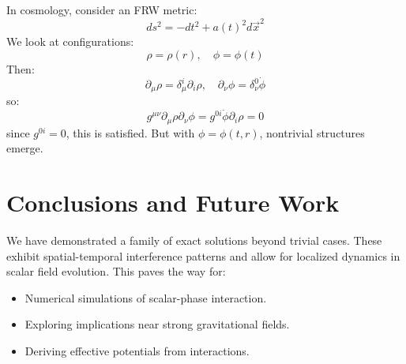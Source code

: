 \documentclass{article}
\begin{document}
In cosmology, consider an FRW metric:
\[
ds^2 = -dt^2 + a(t)^2 d\vec{x}^2
\]
We look at configurations:
\[
\rho = \rho(r), \quad \phi = \phi(t)
\]
Then:
\[
\partial_\mu \rho = \delta^i_\mu \partial_i \rho, \quad
\partial_\nu \phi = \delta^0_\nu \dot{\phi}
\]
so:
\[
g^{\mu\nu} \partial_\mu \rho \partial_\nu \phi = g^{0i} \dot{\phi} \partial_i \rho = 0
\]
since \(g^{0i} = 0\), this is satisfied. But with \(\phi = \phi(t, r)\), nontrivial structures emerge.

\section{Conclusions and Future Work}

We have demonstrated a family of exact solutions beyond trivial cases. These exhibit spatial-temporal interference patterns and allow for localized dynamics in scalar field evolution. This paves the way for:

\begin{itemize}
\item Numerical simulations of scalar-phase interaction.
\item Exploring implications near strong gravitational fields.
\item Deriving effective potentials from interactions.
\end{itemize}
\end{document}
